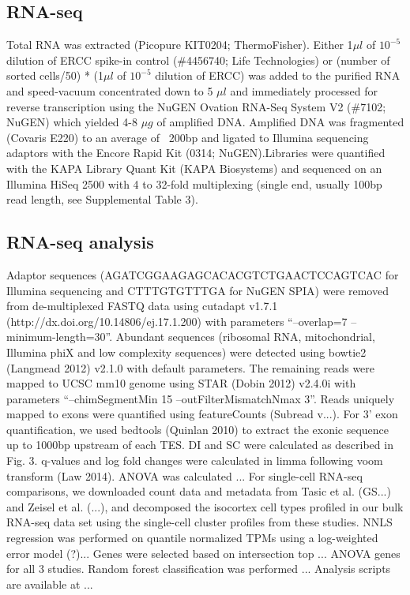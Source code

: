 \subsection{RNA-seq}
Total RNA was extracted (Picopure KIT0204; ThermoFisher). Either 1$\mu l$ of $10^{-5}$ dilution of ERCC spike-in control (\#4456740; Life Technologies) or (number of sorted cells/50) * (1$\mu l$ of $10^{-5}$ dilution of ERCC) was added to the purified RNA and speed-vacuum concentrated down to 5 $\mu l$ and immediately processed for reverse transcription using the NuGEN Ovation RNA-Seq System V2 (\#7102; NuGEN) which yielded 4-8 $\mu g$ of amplified DNA. Amplified DNA was fragmented (Covaris E220) to an average of ~200bp and ligated to Illumina sequencing adaptors with the Encore Rapid Kit (0314; NuGEN).Libraries were quantified with the KAPA Library Quant Kit (KAPA Biosystems) and sequenced on an Illumina HiSeq 2500 with 4 to 32-fold multiplexing (single end, usually 100bp read length, see Supplemental Table 3).

\subsection{RNA-seq analysis}
Adaptor sequences (AGATCGGAAGAGCACACGTCTGAACTCCAGTCAC for Illumina sequencing and CTTTGTGTTTGA for NuGEN SPIA) were removed from de-multiplexed FASTQ data using cutadapt v1.7.1 (http://dx.doi.org/10.14806/ej.17.1.200) with parameters “--overlap=7 --minimum-length=30”. Abundant sequences (ribosomal RNA, mitochondrial, Illumina phiX and low complexity sequences) were detected using bowtie2 (Langmead 2012) v2.1.0 with default parameters. The remaining reads were mapped to UCSC mm10 genome using STAR (Dobin 2012) v2.4.0i with parameters “--chimSegmentMin 15 --outFilterMismatchNmax 3”. 
Reads uniquely mapped to exons were quantified using featureCounts (Subread v...).
For 3' exon quantification, we used bedtools (Quinlan 2010) to extract the exonic sequence up to 1000bp upstream of each TES.
DI and SC were calculated as described in Fig. 3. q-values and log fold changes were calculated in limma following voom transform (Law 2014).
ANOVA was calculated ...
For single-cell RNA-seq comparisons, we downloaded count data and metadata from Tasic et al. (GS...) and Zeisel et al. (...), and decomposed the isocortex cell types profiled in our bulk RNA-seq data set using the single-cell cluster profiles from these studies.
NNLS regression was performed on quantile normalized TPMs using a log-weighted error model (?)... Genes were selected based on intersection top ... ANOVA genes for all 3 studies.
Random forest classification was performed ...
Analysis scripts are available at ...

